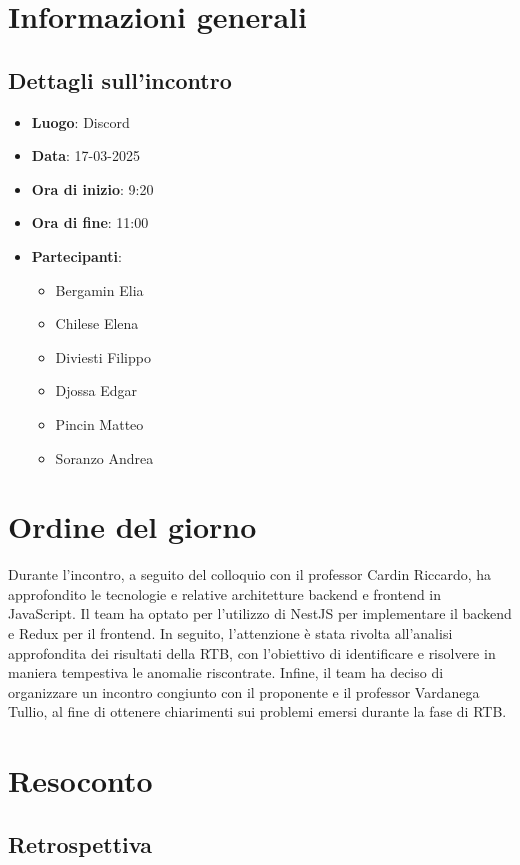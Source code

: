 \section{Informazioni generali}
\subsection{Dettagli sull'incontro}
\begin{itemize}
    \item \textbf{Luogo}: Discord
    \item \textbf{Data}: 17-03-2025
    \item \textbf{Ora di inizio}: 9:20
    \item \textbf{Ora di fine}: 11:00
    \item \textbf{Partecipanti}:
    \begin{itemize}
        \item Bergamin Elia
        \item Chilese Elena
        \item Diviesti Filippo
        \item Djossa Edgar
        \item Pincin Matteo 
        \item Soranzo Andrea  
    \end{itemize}
\end{itemize}

\section{Ordine del giorno}
Durante l'incontro, a seguito del colloquio con il professor Cardin Riccardo, ha approfondito le tecnologie e relative architetture backend e frontend in JavaScript.
Il team ha optato per l'utilizzo di NestJS per implementare il backend e Redux per il frontend.
In seguito, l'attenzione è stata rivolta all'analisi approfondita dei risultati della RTB, con l'obiettivo di identificare e risolvere in maniera tempestiva le anomalie riscontrate.
Infine, il team ha deciso di organizzare un incontro congiunto con il proponente e il professor Vardanega Tullio, al fine di ottenere chiarimenti sui problemi emersi durante la fase di RTB.
\section{Resoconto}
\subsection{Retrospettiva}
